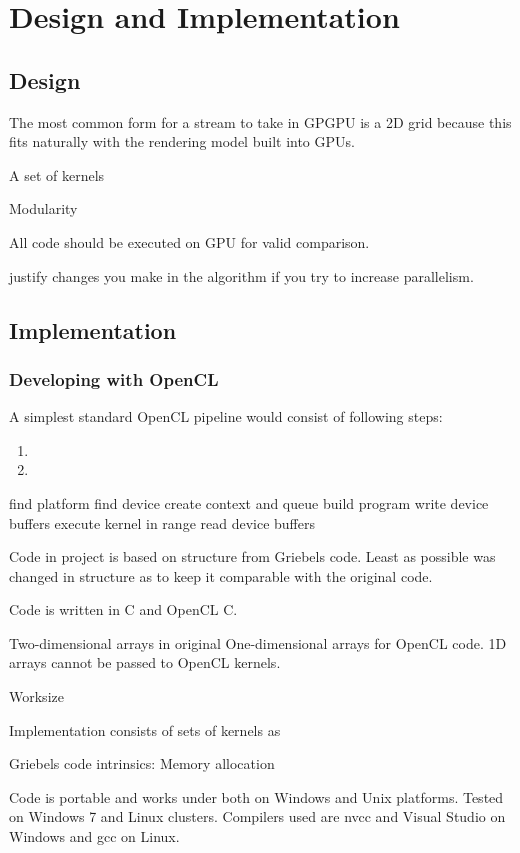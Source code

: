 \chapter{Design and Implementation}

\section{Design}

The most common form for a stream to take in GPGPU is a 2D grid because this fits naturally with the rendering model built into GPUs.

A set of kernels

Modularity

All code should be executed on GPU for valid comparison. 

justify changes you make
in the algorithm if you try to increase parallelism.


\section{Implementation}

\subsection{Developing with OpenCL}
A simplest standard OpenCL pipeline would consist of following steps:

\begin{enumerate}
\item 
\item
\end{enumerate}
find platform
find device
create context and queue
build program
write device buffers
execute kernel in range
read device buffers



Code in project is based on structure from Griebels code\cite{griebel1998numerical}. Least as possible was changed in structure as to keep it comparable with the original code.

Code is written in C and OpenCL C.

Two-dimensional arrays in original 
One-dimensional arrays for OpenCL code. 1D arrays cannot be passed to OpenCL kernels.

Worksize

Implementation consists of sets of kernels as 

Griebels code intrinsics: Memory allocation

Code is portable and works under both on Windows and Unix platforms. Tested on Windows 7 and Linux clusters. Compilers used are nvcc and Visual Studio on Windows and gcc on Linux.

